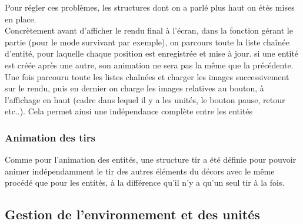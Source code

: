 \documentclass[a4paper,11pt]{article}
\begin{document}
Pour régler ces problèmes, les structures dont on a parlé plus haut on étés mises en place. \\
Concrètement avant d'afficher le rendu final à l'écran, dans la fonction gérant le partie (pour le mode survivant par exemple),
on parcours toute la liste chaînée d'entité, pour laquelle chaque position est enregistrée et mise à jour. si une entité est créée
après une autre, son animation ne sera pas la même que la précédente. Une fois parcouru toute les listes chaînées et charger les images successivement
sur le rendu, puis en dernier on charge les images relatives au bouton, à l'affichage en haut (cadre dans lequel il y a les unités, le bouton pause, retour etc..).
Cela permet ainsi une indépendance complète entre les entités
\subsubsection{Animation des tirs}
Comme pour l'animation des entités, une structure tir a été définie pour pouvoir 
animer indépendamment le tir des autres éléments du décors avec le même procédé que pour les entités, à la différence qu'il n'y a qu'un seul tir à la fois.
\subsection{Gestion de l'environnement et des unités}
\end{document}
